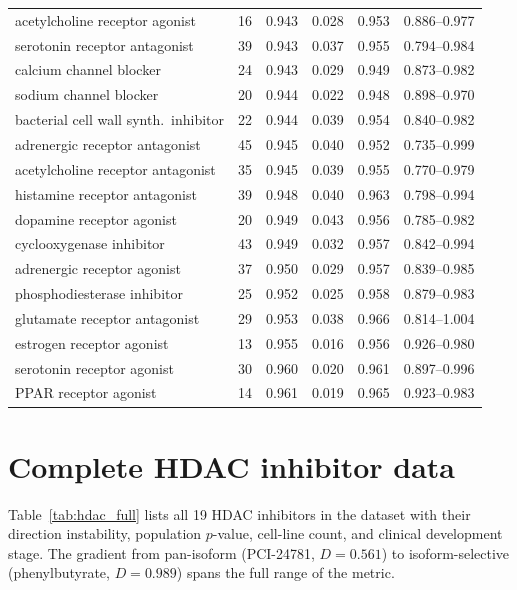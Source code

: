 \documentclass[11pt]{article}
\begin{document}
\begin{table}[h]
\begin{tabular}{lrrrrr}
acetylcholine receptor agonist & 16 & 0.943 & 0.028 & 0.953 & 0.886--0.977 \\
serotonin receptor antagonist & 39 & 0.943 & 0.037 & 0.955 & 0.794--0.984 \\
calcium channel blocker & 24 & 0.943 & 0.029 & 0.949 & 0.873--0.982 \\
sodium channel blocker & 20 & 0.944 & 0.022 & 0.948 & 0.898--0.970 \\
bacterial cell wall synth.\ inhibitor & 22 & 0.944 & 0.039 & 0.954 & 0.840--0.982 \\
adrenergic receptor antagonist & 45 & 0.945 & 0.040 & 0.952 & 0.735--0.999 \\
acetylcholine receptor antagonist & 35 & 0.945 & 0.039 & 0.955 & 0.770--0.979 \\
histamine receptor antagonist & 39 & 0.948 & 0.040 & 0.963 & 0.798--0.994 \\
dopamine receptor agonist & 20 & 0.949 & 0.043 & 0.956 & 0.785--0.982 \\
cyclooxygenase inhibitor & 43 & 0.949 & 0.032 & 0.957 & 0.842--0.994 \\
adrenergic receptor agonist & 37 & 0.950 & 0.029 & 0.957 & 0.839--0.985 \\
phosphodiesterase inhibitor & 25 & 0.952 & 0.025 & 0.958 & 0.879--0.983 \\
glutamate receptor antagonist & 29 & 0.953 & 0.038 & 0.966 & 0.814--1.004 \\
estrogen receptor agonist & 13 & 0.955 & 0.016 & 0.956 & 0.926--0.980 \\
serotonin receptor agonist & 30 & 0.960 & 0.020 & 0.961 & 0.897--0.996 \\
PPAR receptor agonist & 14 & 0.961 & 0.019 & 0.965 & 0.923--0.983 \\
\bottomrule
\end{tabular}
\end{table}

\section{Complete HDAC inhibitor data}
\label{app:hdac}

Table~\ref{tab:hdac_full} lists all 19 HDAC inhibitors in the dataset with
their direction instability, population $p$-value, cell-line count, and
clinical development stage. The gradient from pan-isoform (PCI-24781,
$D = 0.561$) to isoform-selective (phenylbutyrate, $D = 0.989$) spans the
full range of the metric.
\end{document}
